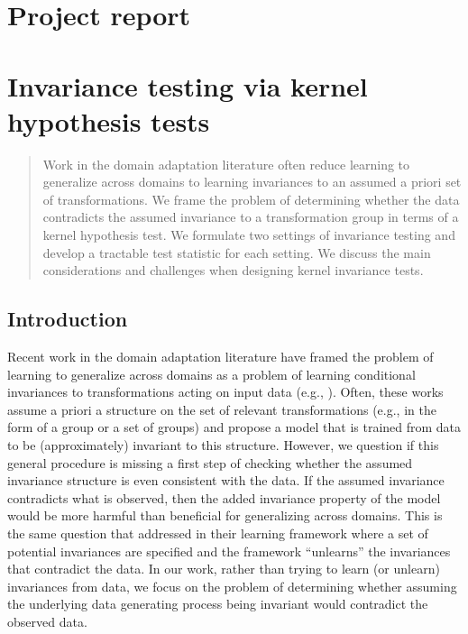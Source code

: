 

\section{Project report}
\vspace{1em}

\section*{Invariance testing via kernel hypothesis tests}
\vspace{1em}

\begin{abstract}
Work in the domain adaptation literature often reduce learning to generalize across domains to learning invariances to an assumed a priori set of transformations. We frame the problem of determining whether the data contradicts the assumed invariance to a transformation group in terms of a kernel hypothesis test. We formulate two settings of invariance testing and develop a tractable test statistic for each setting. We discuss the main considerations and challenges when designing kernel invariance tests.
\end{abstract}


\subsection{Introduction}

Recent work in the domain adaptation literature have framed the problem of learning to generalize across domains as a problem of learning conditional invariances to transformations acting on input data (e.g., \parencite{Gu:2019,Chen:2020:scm,Schwobel:2021}). Often, these works assume a priori a structure on the set of relevant transformations (e.g., in the form of a group or a set of groups) and propose a model that is trained from data to be (approximately) invariant to this structure. However, we question if this general procedure is missing a first step of checking whether the assumed invariance structure is even consistent with the data. If the assumed invariance contradicts what is observed, then the added invariance property of the model would be more harmful than beneficial for generalizing across domains. This is the same question that \textcite{Mouli:2021} addressed in their learning framework where a set of potential invariances are specified and the framework ``unlearns'' the invariances that contradict the data. In our work, rather than trying to learn (or unlearn) invariances from data, we focus on the problem of determining whether assuming the underlying data generating process being invariant would contradict the observed data.
\\

